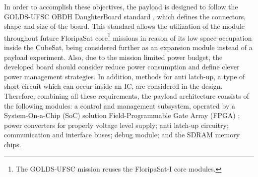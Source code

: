 
In order to accomplish these objectives, the payload is designed to follow the GOLDS-UFSC OBDH DaughterBoard standard \cite{golds_ufsc} \cite{fsatobdh}, which defines the connectors, shape and size of the board. This standard allows the utilization of the module throughout future FloripaSat \cite{floripasat} core\footnote{The GOLDS-UFSC mission reuses the FloripaSat-I core modules.} missions in reason of its low space occupation inside the CubeSat, being considered further as an expansion module instead of a payload experiment. Also, due to the mission limited power budget, the developed board should consider reduce power consumption and define clever power management strategies. In addition, methods for anti latch-up, a type of short circuit which can occur inside an IC, are considered in the design. Therefore, combining all these requirements, the payload architecture consists of the following modules: a control and management subsystem, operated by a System-On-a-Chip (SoC) solution Field-Programmable Gate Array (FPGA) \cite{what_is_soc_fpga}; power converters for properly voltage level supply; anti latch-up circuitry; communication and interface buses; debug module; and the SDRAM memory chips.

\clearpage





